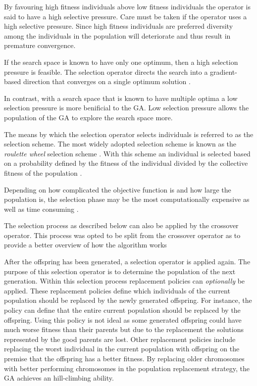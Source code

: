 By favouring high fitness individuals above low fitness individuals the operator is said to have a high selective pressure\cite{CompuIntelligenceIntro}. Care must be taken if the operator uses a high selective pressure. Since high fitness individuals are preferred diversity among the individuals in the population will deteriorate and thus result in premature convergence\cite{ConstrainedGA, CompuIntelligenceIntro}.

If the search space is known to have only one optimum, then a high selection pressure is feasible\cite{ConstrainedGA}. The selection operator directs the search into a gradient-based direction that converges on a single optimum solution \cite{ConstrainedGA}. 

In contrast, with a search space that is known to have multiple optima a low selection pressure is more benificial to the \gls{GA}\cite{ConstrainedGA}. Low selection pressure allows the population of the \gls{GA} to explore the search space more\cite{ConstrainedGA}.

The means by which the selection operator selects individuals is referred to as the selection scheme. The most widely adopted selection scheme is known as the \emph{roulette wheel} selection scheme \cite{ConstrainedGA,GeostatisticalGA,HybridBaldwinGA,CoactiveFuzzyGA}. With this scheme an individual is selected based on a probability defined by the fitness of the individual divided by the collective fitness of the population \cite{GeostatisticalGA}.

Depending on how complicated the objective function is and how large the population is, the selection phase may be the most computationally expensive as well as time consuming \cite{AcceleratingGA}.

The selection process as described below  can also be applied by the crossover operator. This process was opted to be split from the crossover operator as to provide a better overview of how the algorithm works

After the offspring has been generated, a selection operator is applied again\cite{CompuIntelligenceIntro}. The purpose of this selection operator is to determine the population of the next generation\cite{CompuIntelligenceIntro}. Within this selection process replacement policies can \emph{optionally} be applied\cite{CompuIntelligenceIntro}. These replacement policies define which individuals of the current population should be replaced by the newly generated offspring\cite{CompuIntelligenceIntro}. For instance, the policy can define that the entire current population should be replaced by the offspring\cite{CompuIntelligenceIntro}. Using this policy is not ideal as some generated offspring could have much worse fitness than their parents but due to the replacement the solutions represented by the good parents are lost\cite{CompuIntelligenceIntro}. Other replacement policies include replacing the worst individual in the current population with offspring on the premise that the offspring has a better fitness\cite{CompuIntelligenceIntro}. By replacing older chromosomes with better performing chromosomes in the population replacement strategy, the \gls{GA} achieves an hill-climbing ability.

